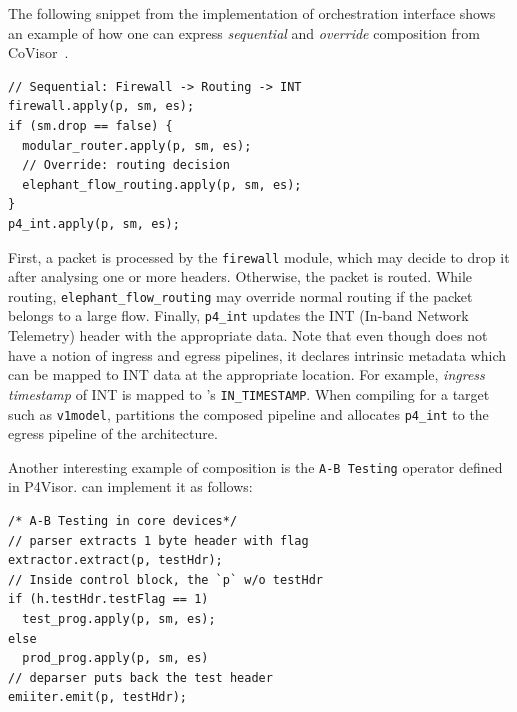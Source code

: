 \documentclass[letterpaper,twocolumn,10pt]{article}
\begin{document}
%
The following \ulang snippet from the implementation of orchestration
interface shows an example of how one can express \emph{sequential}
and \emph{override} composition from CoVisor~\cite{188954}.
\begin{lstlisting}[frame=none, escapechar=!]
// Sequential: Firewall -> Routing -> INT
firewall.apply(p, sm, es);
if (sm.drop == false) {
  modular_router.apply(p, sm, es);
  // Override: routing decision
  elephant_flow_routing.apply(p, sm, es);
}
p4_int.apply(p, sm, es);
\end{lstlisting}

First, a packet is processed by the \texttt{firewall} module, which
may decide to drop it after analysing one or more headers. Otherwise,
the packet is routed.  While routing,
\texttt{elephant\_flow\_routing} may override normal routing if
the packet belongs to a large flow. Finally,
\texttt{p4\_int} updates the INT (In-band Network Telemetry)
\cite{Kim2015InbandNT, p4int} header with the appropriate data. Note
that even though \uarch does not have a notion of ingress and egress
pipelines, it declares intrinsic metadata which can be mapped to INT
data at the appropriate location. For example, \emph{ingress
timestamp} of INT is mapped to \ulang's \texttt{IN\_TIMESTAMP}. When
compiling for a target such as \texttt{v1model}, \ucomp partitions the
composed pipeline and allocates \texttt{p4\_int} to the egress
pipeline of the architecture.

Another interesting example of composition is the \texttt{A-B Testing}
operator defined in P4Visor\cite{Zheng:2018:PLV:3281411.3281436}.
\ulang can implement it as follows:
\begin{lstlisting}[frame=none, escapechar=!]
/* A-B Testing in core devices*/
// parser extracts 1 byte header with flag
extractor.extract(p, testHdr);
// Inside control block, the `p` w/o testHdr
if (h.testHdr.testFlag == 1)
  test_prog.apply(p, sm, es);
else
  prod_prog.apply(p, sm, es)
// deparser puts back the test header
emiiter.emit(p, testHdr);
\end{lstlisting}
\end{document}
